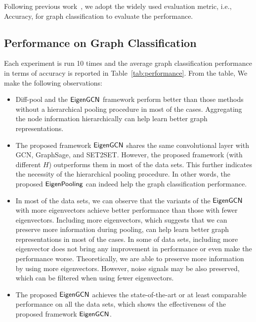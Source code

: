 \documentclass[sigconf]{acmart}
\newcommand{\m}{{\sf {EigenGCN}}}
\newcommand{\pooling}{{\sf {EigenPooling}}}
\begin{document}
Following previous work~\cite{ying2018hierarchical}, we adopt the widely used evaluation metric, i.e., Accuracy, for graph classification to evaluate the performance.

\subsection{Performance on Graph Classification}
Each experiment is run 10 times and the average graph classification performance in terms of accuracy is reported in Table~\ref{tab:performance}. From the table, We make the following observations:
\begin{itemize}
    \item Diff-pool and the $\m$ framework perform better than those methods without a hierarchical pooling procedure in most of the cases. Aggregating the node information hierarchically can help learn better graph representations.
    \item The proposed framework $\m$ shares the same convolutional layer with GCN, GraphSage, and SET2SET. However, the proposed framework (with different $H$) outperforms them in most of the data sets. This further indicates the necessity of the hierarchical pooling procedure. In other words, the proposed $\pooling$ can indeed help the graph classification performance.  
    \item In most of the data sets, we can observe that the variants of the $\m$ with more eigenvectors achieve better performance than those with fewer eigenvectors. Including more eigenvectors, which suggests that we can preserve more information during pooling, can help learn better graph representations in most of the cases. In some of data sets, including more eigenvector does not bring any improvement in performance or even make the performance worse. Theoretically, we are able to preserve more information by using more eigenvectors. However, noise signals may be also preserved, which can be filtered when using fewer eigenvectors. 
    \item The proposed $\m$ achieves the state-of-the-art or at least comparable performance on all the data sets, which shows the effectiveness of the proposed framework $\m$. 
\end{itemize}
\end{document}
